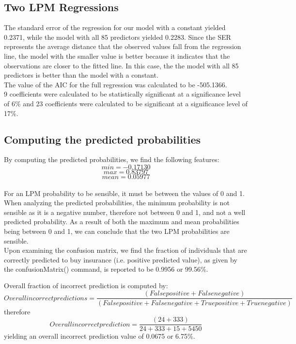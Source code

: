 \documentclass{article}
\begin{document}
\subsection{Two LPM Regressions}
The standard error of the regression for our model with a constant yielded 0.2371, while the model with all 85 predictors yielded 0.2283. Since the SER represents the average distance that the observed values fall from the regression line, the model with the smaller value is better because it indicates that the observations are closer to the fitted line. In this case, the the model with all 85 predictors is better than the model with a constant. \\
The value of the AIC for the full regression was calculated to be -505.1366. \\
9 coefficients were calculated to be statistically significant at a significance level of 6\%  and 23 coefficients were calculated to be significant at a significance level of 17\%.

\subsection{Computing the predicted probabilities}
By computing the predicted probabilities, we find the following features:\\
$$ min=-0.17130$$ $$max= 0.83797$$ $$mean=0.05977 $$\\
\newline
For an LPM probability to be sensible, it must be between the values of 0 and 1. When analyzing the predicted probabilities, the minimum probability is not sensible as it is a negative number, therefore not between 0 and 1, and not a well predicted probability. As a result of both the maximum and mean probabilities being between 0 and 1, we can conclude that the two LPM probabilities are sensible.\\
\newline
Upon examining the confusion matrix, we find the fraction of individuals that are correctly predicted to buy insurance (i.e. positive predicted value), as given by the confusionMatrix() command, is reported to be 0.9956 or 99.56\%.

\newline
Overall fraction of incorrect prediction is computed by:
$$ Overall incorrect predictions =  \frac{(False positive + False negative)}{(False positive + False negative + True positive + True negative)}  $$
therefore 
$$ Overall incorrect prediction = \frac{(24 + 333)}{24+333+15+5450} $$
yielding an overall incorrect prediction value of 0.0675 or 6.75\%. \\
\end{document}

